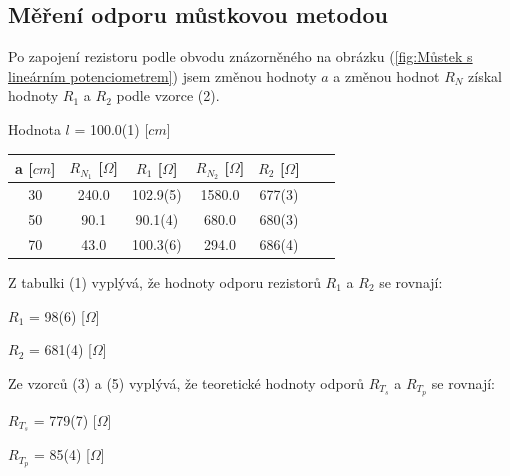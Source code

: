\documentclass[a4paper,11pt]{article}
\begin{document}
\begin{minipage}[]{0.5\textwidth}
        \subsection{Měření odporu můstkovou metodou}
            Po zapojení rezistoru podle obvodu znázorněného na obrázku (\ref{fig:Můstek s lineárním potenciometrem}) jsem změnou hodnoty $a$ a změnou hodnot $R_N$ získal hodnoty $R_1$ a $R_2$ podle vzorce (2). 
            \begin{center}
                Hodnota $l$ = 100.0(1) [$cm$]
            \end{center}
            \centering
            \begin{tabular}{|c|c|c|c|c|c|c|}
                \hline
                a [$cm$] & $R_{N_1}$ [$\Omega$] & $R_1$ [$\Omega$] & $R_{N_2}$ [$\Omega$] & $R_2$ [$\Omega$] \\
                \hline
                30 & 240.0 & 102.9(5) & 1580.0 & 677(3)\\
                \hline
                50 & 90.1 & 90.1(4) & 680.0 & 680(3)\\
                \hline
                70 & 43.0 & 100.3(6) & 294.0 & 686(4)\\
                \hline
            \end{tabular}
            \captionsetup{justification=centering, font=footnotesize}
            \vspace{10pt}
            \raggedright
            \par Z tabulki (1) vyplývá, že hodnoty odporu rezistorů $R_1$ a $R_2$ se rovnají:
            \begin{center}
                $R_1$ = 98(6) [$\Omega$]
                \par $R_2$ = 681(4) [$\Omega$]
            \end{center}
            \par Ze vzorců (3) a (5) vyplývá, že teoretické hodnoty odporů $R_{T_s}$ a $R_{T_p}$ se rovnají: 
            \begin{center}
                $R_{T_s}$ = 779(7) [$\Omega$]
                \par $R_{T_p}$ = 85(4) [$\Omega$]
            \end{center}
    \end{minipage}
\newpage
\end{document}
